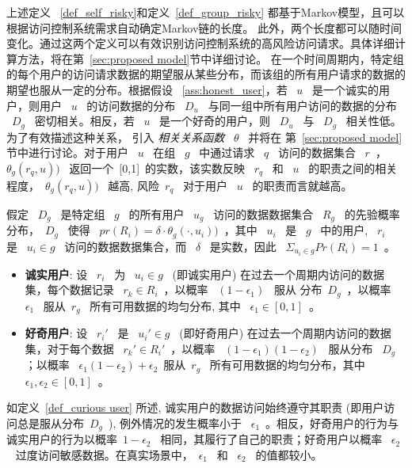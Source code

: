 上述定义 ~\ref{def_self_risky}和定义~\ref{def_group_risky} 都基于Markov模型，且可以根据访问控制系统需求自动确定Markov链的长度。 此外，两个长度都可以随时间变化。通过这两个定义可以有效识别访问控制系统的高风险访问请求。具体详细计算方法，将在第~\ref{sec:proposed model}节中详细讨论。 在一个时间周期内，特定组的每个用户的访问请求数据的期望服从某些分布，而该组的所有用户请求的数据的期望也服从一定的分布。根据假设 ~\ref{ass:honest_user}，若 ~$u$~ 是一个诚实的用户，则用户 ~$u$~ 的访问数据的分布 ~$D_u$~ 与同一组中所有用户访问的数据的分布 ~$D_g$~ 密切相关。相反，若 ~$u$~ 是一个好奇的用户，则 ~$D_u$~ 与 ~$D_g$~ 相关性低。 为了有效描述这种关系， 引入 \emph{相关关系函数} ~$\theta$~ 并将在 第~\ref{sec:proposed model}节中进行讨论。对于用户 ~$u$~ 在组 ~$g$~ 中通过请求 ~$q$~ 访问的数据集合 ~$r$~，~$\theta_g (r_q,u))$~ 返回一个~[0,1]~的实数，该实数反映 ~$r_q$~ 和 ~$u$~ 的职责之间的相关程度，~$\theta_g (r_q,u))$~ 越高, 风险~$r_q$~ 对于用户 ~$u$~ 的职责而言就越高。


\begin{definition}%
	\label{def_curious user}
	假定 ~$D_g$~ 是特定组 ~$g$~ 的所有用户 ~$u_g$~ 访问的数据数据集合 ~$R_g$~ 的先验概率分布，~$D_g$~ 使得 ~$pr(R_i)=\delta \cdot \theta_g (\cdot,u_i))$~，其中 ~$u_i$~ 是 ~$g$~ 中的用户, ~$r_i$~ 是 ~$u_i \in g$~ 访问的数据数据集合，而 ~$\delta$~ 是实数，因此 ~$\Sigma_{u_i \in g}Pr(R_i) = 1$~。
	\begin{itemize}
		\item \textbf{诚实用户}: 设 ~$r_i$~ 为 ~$u_i \in g$~ (即诚实用户) 在过去一个周期内访问的数据集，每个数据记录 ~$r_k \in R_i$~，以概率 ~$(1-\epsilon_1)$~ 服从 分布~$D_g$~，以概率 ~$\epsilon_1$~ 服从~$r_g$~ 所有可用数据的均匀分布, 其中 ~$\epsilon_1 \in [0,1]$~。
		\item \textbf{好奇用户}: 设 ~$r_i'$~ 是 ~$u_i' \in g$~ (即好奇用户) 在过去一个周期内访问的数据集，对于每个数据 ~$r_k' \in R_i'$~，以概率 ~$(1-\epsilon_1)(1-\epsilon_2)$~ 服从分布 ~$D_g$~ ；以概率 ~$\epsilon_1 (1 - \epsilon_2)+ \epsilon_2$~服从~$r_g$~ 所有可用数据的均匀分布，其中 ~$\epsilon_1, \epsilon_2 \in [0,1]$~。
	\end{itemize}
\end{definition}

如定义~\ref{def_curious user} 所述, 诚实用户的数据访问始终遵守其职责 (即用户访问总是服从分布~$D_g$~), 例外情况的发生概率小于 ~$\epsilon_1$~。相反，好奇用户的行为与诚实用户的行为以概率~$1-\epsilon_2$~ 相同，其履行了自己的职责；好奇用户以概率 ~$\epsilon_2$~ 过度访问敏感数据。在真实场景中，~$\epsilon_1$~ 和 ~$\epsilon_2$~ 的值都较小。

